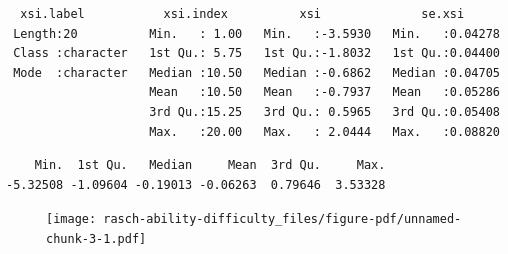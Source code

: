 \documentclass[
  letterpaper,
  DIV=11,
  numbers=noendperiod]{scrreprt}
\newenvironment{Shaded}{\begin{snugshade}}{\end{snugshade}}
\newcommand{\AttributeTok}[1]{\textcolor[rgb]{0.40,0.45,0.13}{#1}}
\newcommand{\FloatTok}[1]{\textcolor[rgb]{0.68,0.00,0.00}{#1}}
\newcommand{\FunctionTok}[1]{\textcolor[rgb]{0.28,0.35,0.67}{#1}}
\newcommand{\NormalTok}[1]{\textcolor[rgb]{0.00,0.23,0.31}{#1}}
\newcommand{\OtherTok}[1]{\textcolor[rgb]{0.00,0.23,0.31}{#1}}
\newcommand{\SpecialCharTok}[1]{\textcolor[rgb]{0.37,0.37,0.37}{#1}}
\begin{document}
\begin{Shaded}
\end{Shaded}

\begin{verbatim}
  xsi.label           xsi.index          xsi              se.xsi       
 Length:20          Min.   : 1.00   Min.   :-3.5930   Min.   :0.04278  
 Class :character   1st Qu.: 5.75   1st Qu.:-1.8032   1st Qu.:0.04400  
 Mode  :character   Median :10.50   Median :-0.6862   Median :0.04705  
                    Mean   :10.50   Mean   :-0.7937   Mean   :0.05286  
                    3rd Qu.:15.25   3rd Qu.: 0.5965   3rd Qu.:0.05408  
                    Max.   :20.00   Max.   : 2.0444   Max.   :0.08820  
\end{verbatim}

\begin{Shaded}
\end{Shaded}

\begin{verbatim}
    Min.  1st Qu.   Median     Mean  3rd Qu.     Max. 
-5.32508 -1.09604 -0.19013 -0.06263  0.79646  3.53328 
\end{verbatim}

\begin{Shaded}
\end{Shaded}

\begin{figure}[H]

{\centering \texttt{[image: rasch-ability-difficulty\_files/figure-pdf/unnamed-chunk-3-1.pdf]}

}

\end{figure}
\end{document}

